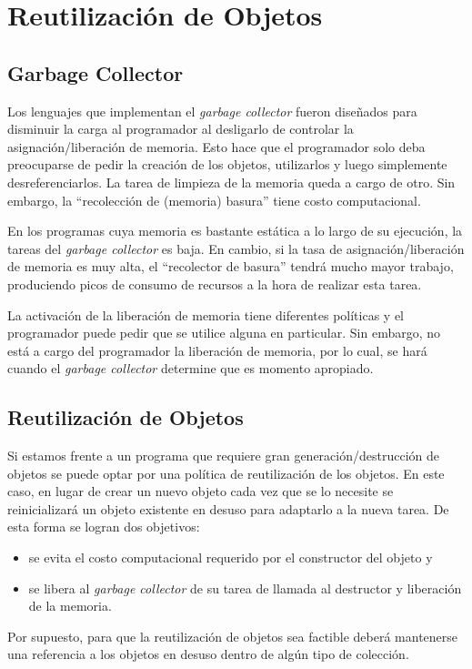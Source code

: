\section*{Reutilización de Objetos}

\subsection*{Garbage Collector}

Los lenguajes que implementan el \emph{garbage collector} fueron
diseñados para disminuir la carga al programador al desligarlo de
controlar la asignación/liberación de memoria. Esto hace que el
programador solo deba preocuparse de pedir la creación de los objetos,
utilizarlos y luego simplemente desreferenciarlos. La tarea de limpieza
de la memoria queda a cargo de otro. Sin embargo, la ``recolección de
(memoria) basura'' tiene costo computacional.

En los programas cuya memoria es bastante estática a lo largo de su
ejecución, la tareas del \emph{garbage collector} es baja. En cambio,
si la tasa de asignación/liberación de memoria es muy alta, el
``recolector de basura'' tendrá mucho mayor trabajo, produciendo picos
de consumo de recursos a la hora de realizar esta tarea.

La activación de la liberación de memoria tiene diferentes políticas y
el programador puede pedir que se utilice alguna en particular. Sin
embargo, no está a cargo del programador la liberación de memoria, por
lo cual, se hará cuando el \emph{garbage collector} determine que es
momento apropiado.


\subsection*{Reutilización de Objetos}

Si estamos frente a un programa que requiere gran generación/destrucción
de objetos se puede optar por una política de reutilización de los objetos.
En este caso, en lugar de crear un nuevo objeto cada vez que se lo necesite
se reinicializará un objeto existente en desuso para adaptarlo a la nueva
tarea. De esta forma se logran dos objetivos:
\begin{itemize}
    \item se evita el costo computacional requerido por el constructor del
    objeto y
    \item se libera al \emph{garbage collector} de su tarea de llamada al
    destructor y liberación de la memoria.
\end{itemize}
Por supuesto, para que la reutilización de objetos sea factible deberá mantenerse una referencia a los objetos en desuso dentro de algún tipo
de colección.


